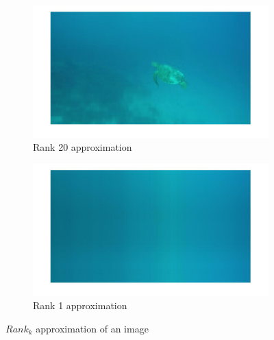 \documentclass[12pt]{article}
\begin{document}
\begin{figure}
    \begin{subfigure}[t]{.49\textwidth}
        \centering
        \includegraphics[width=\linewidth]{rank20}
        \caption{Rank 20 approximation}
        \label{fig_rank20}
    \end{subfigure}\hfill
    \begin{subfigure}[t]{.49\textwidth}
        \centering
        \includegraphics[width=\linewidth]{rank1}
        \caption{Rank 1 approximation}
        \label{fig_rank1}
    \end{subfigure}
    \caption{$Rank_k$ approximation of an image}
    \label{fig_rank_approx}
\end{figure}
\end{document}
